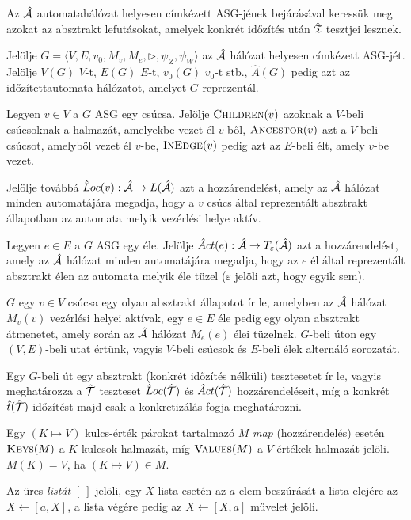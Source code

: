 Az $\hat{\mathcal{A}}$ automatahálózat helyesen címkézett ASG-jének bejárásával keressük meg azokat az absztrakt lefutásokat, amelyek konkrét időzítés után $\hat{\mathfrak{T}}$ tesztjei lesznek.

Jelölje $G = \langle V, E, v_0, M_v, M_e, \rhd, \psi_Z, \psi_W \rangle$ az $\hat{\mathcal{A}}$ hálózat helyesen címkézett ASG-jét. Jelölje $V(G)$ $V$-t, $E(G)$ $E$-t, $v_0(G)$ $v_0$-t stb., $\hat{A}(G)$ pedig azt az időzítettautomata-hálózatot, amelyet $G$ reprezentál.

Legyen $v \in V$ a $G$ ASG egy csúcsa. Jelölje $\textsc{Children}(v)$ azoknak a $V$-beli csúcsoknak a halmazát, amelyekbe vezet él $v$-ből, $\textsc{Ancestor}(v)$ azt a $V$-beli csúcsot, amelyből vezet él $v$-be, $\textsc{InEdge}(v)$ pedig azt az $E$-beli élt, amely $v$-be vezet.

Jelölje továbbá $\hat{L}oc(v): \hat{\mathcal{A}} \rightarrow L(\hat{\mathcal{A}})$ azt a hozzárendelést, amely az $\hat{\mathcal{A}}$ hálózat minden automatájára megadja, hogy a $v$ csúcs által reprezentált absztrakt állapotban az automata melyik vezérlési helye aktív.

Legyen $e \in E$ a $G$ ASG egy éle. Jelölje $\hat{A}ct(e): \hat{\mathcal{A}} \rightarrow T_\varepsilon(\hat{\mathcal{A}})$ azt a hozzárendelést, amely az $\hat{\mathcal{A}}$ hálózat minden automatájára megadja, hogy az $e$ él által reprezentált absztrakt élen az automata melyik éle tüzel ($\varepsilon$ jelöli azt, hogy egyik sem).

$G$ egy $v \in V$ csúcsa egy olyan absztrakt állapotot ír le, amelyben az $\hat{\mathcal{A}}$ hálózat $M_v(v)$ vezérlési helyei aktívak, egy $e \in E$ éle pedig egy olyan absztrakt átmenetet, amely során az $\hat{\mathcal{A}}$ hálózat $M_e(e)$ élei tüzelnek. $G$-beli úton egy $(V, E)$-beli utat értünk, vagyis $V$-beli csúcsok és $E$-beli élek alternáló sorozatát.

Egy $G$-beli út egy absztrakt (konkrét időzítés nélküli) tesztesetet ír le, vagyis meghatározza a $\hat{\mathcal{T}}$ teszteset $\hat{L}oc(\hat{\mathcal{T}})$ és $\hat{A}ct(\hat{\mathcal{T}})$ hozzárendeléseit, míg a konkrét $\hat{t}(\hat{\mathcal{T}})$ időzítést majd csak a konkretizálás fogja meghatározni.

Egy $(K \mapsto V)$ kulcs-érték párokat tartalmazó $M$ \emph{map} (hozzárendelés) esetén $\textsc{Keys}(M)$ a $K$ kulcsok halmazát, míg $\textsc{Values}(M)$ a $V$ értékek halmazát jelöli. $M(K) = V$, ha $(K \mapsto V) \in M$.

Az üres \emph{listát}  $[\ ]$ jelöli, egy $X$ lista esetén az $a$ elem beszúrását a lista elejére az $X \gets [a, X]$, a lista végére pedig az $X \gets [X, a]$ művelet jelöli.

